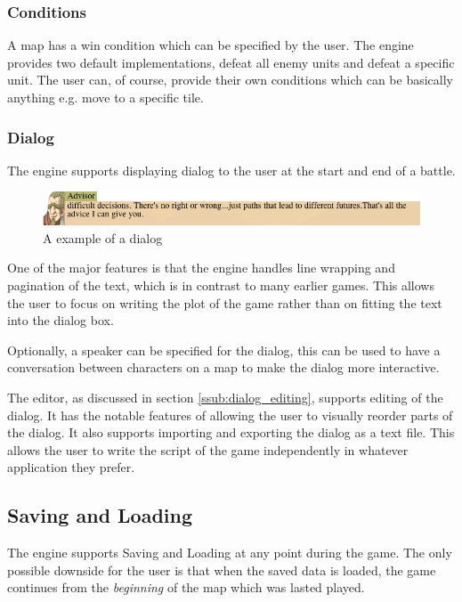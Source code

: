 \subsubsection{Conditions}
\label{ssub:events}

A map has a win condition which can be specified by the user.  The engine provides two default implementations, defeat all enemy units and defeat a specific unit.  The user can, of course, provide their own conditions which can be basically anything e.g. move to a specific tile. 

\subsubsection{Dialog}
\label{ssub:dialog}
The engine supports displaying dialog to the user at the start and end of a battle. 

\begin{figure}[htbp]
	\centering
		\includegraphics[width=6.3in]{figures/dialog2.png}
	\caption{A example of a dialog}
	\label{fig:figures_dialog2}
\end{figure}

One of the major features is that the engine handles line wrapping and pagination of the text, which is in contrast to many earlier games. This allows the user to focus on writing the plot of the game rather than on fitting the text into the dialog box. 

Optionally, a speaker can be specified for the dialog, this can be used to have a conversation between characters on a map to make the dialog more interactive. 

The editor, as discussed in section \ref{ssub:dialog_editing}, supports editing of the dialog. It has the notable features of allowing the user to visually reorder parts of the dialog. It also supports   importing and exporting the dialog as a text file.  This allows the user to write the script of the game independently in whatever application they prefer. 


\subsection{Saving and Loading}
The engine supports Saving and Loading at any point during the game. The only possible downside  for the user is that when the saved data is loaded, the game continues from the \emph{beginning} of the map which was lasted played. 

